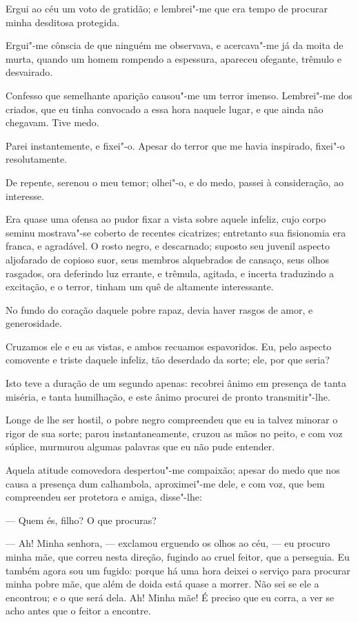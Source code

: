 Ergui ao céu um voto de gratidão; e lembrei"-me que era tempo de procurar
minha desditosa protegida.

Ergui"-me cônscia de que ninguém me observava, e acercava"-me já da moita
de murta, quando um homem rompendo a espessura, apareceu ofegante,
trêmulo e desvairado.

Confesso que semelhante aparição causou"-me um terror imenso. Lembrei"-me
dos criados, que eu tinha convocado a essa hora naquele lugar, e que
ainda não chegavam. Tive medo.

Parei instantemente, e fixei"-o. Apesar do terror que me havia inspirado,
fixei"-o resolutamente.

De repente, serenou o meu temor; olhei"-o, e do medo, passei à
consideração, ao interesse.

Era quase uma ofensa ao pudor fixar a vista sobre aquele infeliz, cujo
corpo seminu mostrava"-se coberto de recentes cicatrizes; entretanto sua
fisionomia era franca, e agradável. O rosto negro, e descarnado; suposto
seu juvenil aspecto aljofarado de copioso suor, seus membros alquebrados
de cansaço, seus olhos rasgados, ora deferindo luz errante, e trêmula,
agitada, e incerta traduzindo a excitação, e o terror, tinham um quê de
altamente interessante.

No fundo do coração daquele pobre rapaz, devia haver rasgos de amor, e
generosidade.

Cruzamos ele e eu as vistas, e ambos recuamos espavoridos. Eu, pelo
aspecto comovente e triste daquele infeliz, tão deserdado da sorte; ele,
por que seria?

Isto teve a duração de um segundo apenas: recobrei ânimo em presença de
tanta miséria, e tanta humilhação, e este ânimo procurei de pronto
transmitir"-lhe.

Longe de lhe ser hostil, o pobre negro compreendeu que eu ia talvez
minorar o rigor de sua sorte; parou instantaneamente, cruzou as mãos no
peito, e com voz súplice, murmurou algumas palavras que eu não pude
entender.

Aquela atitude comovedora despertou"-me compaixão; apesar do medo que nos
causa a presença dum calhambola, aproximei"-me dele, e com voz, que bem
compreendeu ser protetora e amiga, disse"-lhe:

--- Quem és, filho? O que procuras?

--- Ah! Minha senhora, --- exclamou erguendo os olhos ao céu, --- eu
procuro minha mãe, que correu nesta direção, fugindo ao cruel feitor,
que a perseguia. Eu também agora sou um fugido: porque há uma hora
deixei o serviço para procurar minha pobre mãe, que além de doida está
quase a morrer. Não sei se ele a encontrou; e o que será dela. Ah! Minha
mãe! É preciso que eu corra, a ver se acho antes que o feitor a
encontre.

